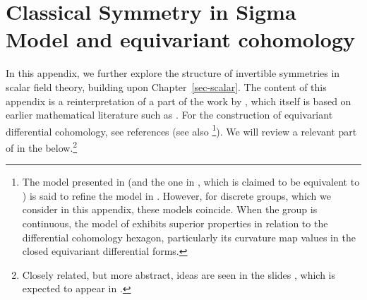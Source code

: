 \documentclass[
  letterpaper,
  DIV=11,
  numbers=noendperiod]{scrreport}
\begin{document}
\chapter{Classical Symmetry in Sigma Model and equivariant
cohomology}\label{sec-equivariant}

In this appendix, we further explore the structure of invertible
symmetries in scalar field theory, building upon
Chapter~\ref{sec-scalar}. The content of this appendix is a
reinterpretation of a part of the work by \autocite{Davighi:2020vcm},
which itself is based on earlier mathematical literature such as
\autocite{Freed:2006mx}. For the construction of equivariant
differential cohomology, see references
\autocite{kubel2018equivariant,redden2016differential} (see also
\autocite{gomi2005equivariant}\footnote{The model presented in
  \autocite{kubel2018equivariant} (and the one in
  \autocite{redden2016differential}, which is claimed to be equivalent
  to \autocite{kubel2018equivariant}) is said to refine the model in
  \autocite{gomi2005equivariant}. However, for discrete groups, which we
  consider in this appendix, these models coincide. When the group is
  continuous, the model of \autocite{kubel2018equivariant} exhibits
  superior properties in relation to the differential cohomology
  hexagon, particularly its curvature map values in the closed
  equivariant differential forms.}). We will review a relevant part of
\autocite{kubel2018equivariant} in the below.\footnote{Closely related,
  but more abstract, ideas are seen in the slides \autocite{SatiSlides},
  which is expected to appear in \autocite{SatiSchreiberTED}.}
\end{document}
